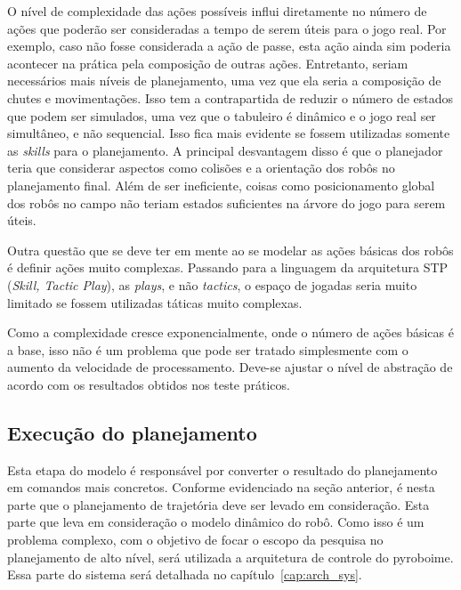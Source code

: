 O nível de complexidade das ações possíveis influi diretamente no número de
ações que poderão ser consideradas a tempo de serem úteis para o jogo real. Por
exemplo, caso não fosse considerada a ação de passe, esta ação ainda sim poderia
acontecer na prática pela composição de outras ações. Entretanto, seriam
necessários mais níveis de planejamento, uma vez que ela seria a composição de
chutes e movimentações. Isso tem a contrapartida de reduzir o número de estados
que podem ser simulados, uma vez que o tabuleiro é dinâmico e o jogo real ser
simultâneo, e não sequencial. Isso fica mais evidente se fossem utilizadas
somente as \textit{skills} para o planejamento. A principal desvantagem disso
é que o planejador teria que considerar aspectos como colisões e a orientação
dos robôs no planejamento final. Além de ser ineficiente, coisas como
posicionamento global dos robôs no campo não teriam estados suficientes na
árvore do jogo para serem úteis.

Outra questão que se deve ter em mente ao se modelar as ações básicas dos robôs
é definir ações muito complexas. Passando para a linguagem da arquitetura STP
(\textit{Skill, Tactic Play}), as \textit{plays}, e não \textit{tactics}, o
espaço de jogadas seria muito limitado se fossem utilizadas táticas muito
complexas.

Como a complexidade cresce exponencialmente, onde o número de ações básicas é
a base, isso não é um problema que pode ser tratado simplesmente com o aumento
da velocidade de processamento. Deve-se ajustar o nível de abstração de acordo
com os resultados obtidos nos teste práticos.

\subsection{Execução do planejamento}

Esta etapa do modelo é responsável por converter o resultado do planejamento em
comandos mais concretos. Conforme evidenciado na seção anterior, é nesta parte
que o planejamento de trajetória deve ser levado em consideração. Esta parte que
leva em consideração o modelo dinâmico do robô.
Como isso é um problema complexo, com o objetivo de focar o escopo da pesquisa
no planejamento de alto nível, será utilizada a arquitetura de controle do
pyroboime. Essa parte do sistema será detalhada no capítulo~\ref{cap:arch_sys}.

